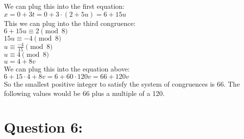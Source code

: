 \documentclass{article}
\begin{document}
\noindent
We can plug this into the first equation:
\\
\noindent
$ x = 0 + 3t = 0 + 3 \cdot (2 + 5u) = 6 + 15u $ \\

\noindent
This we can plug into the third congruence:\\
\noindent
$6 + 15u \equiv 2 \pmod 8$ \\
$15u \equiv -4 \pmod 8$ \\
$u \equiv \frac{-4}{15} \pmod 8$ \\
$u \equiv 4 \pmod 8$ \\
$u = 4 + 8v$ \\

\noindent
We can plug this into the equation above: \\

$6 + 15 \cdot 4 + 8v = 6 + 60 \cdot 120v = 66 + 120v$\\

\noindent
So the smallest positive integer to satisfy the system of congruences is 66. The following values would be 66 plus a multiple of a 120.

\section{Question 6:}

\end{document}
